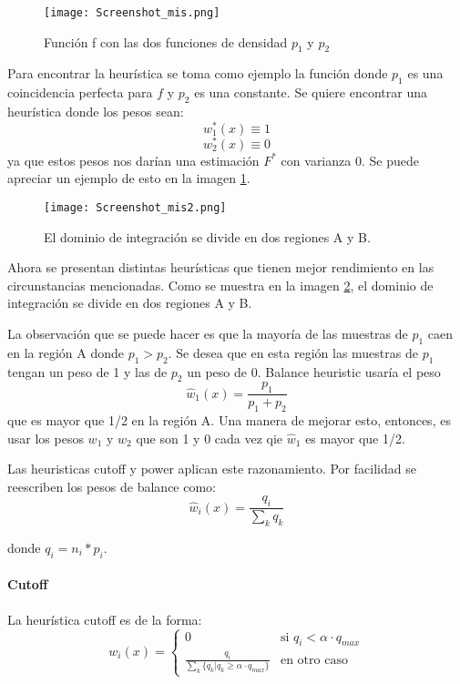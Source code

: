 \documentclass{article}
\begin{document}
\begin{figure}[H]
\centering
\texttt{[image: Screenshot\_mis.png]}
\caption{Función f con las dos funciones de densidad $p_{1}$ y $p_{2}$}
\label{fig:misother}
\end{figure}

Para encontrar la heurística se toma como ejemplo la función donde $p_{1}$ es una coincidencia perfecta para $f$ y $p_{2}$ es una constante.
Se quiere encontrar una heurística donde los pesos sean:
$$w^{*}_{1}(x) \equiv 1$$
$$w^{*}_{2}(x) \equiv 0$$
ya que estos pesos nos darían una estimación $F^{*}$ con varianza 0.
Se puede apreciar un ejemplo de esto en la imagen \ref{fig:misother}.

\begin{figure}[H]
\centering
\texttt{[image: Screenshot\_mis2.png]}
\caption{El dominio de integración se divide en dos regiones A y B.}
\label{fig:misother2}
\end{figure}

Ahora se presentan distintas heurísticas que tienen mejor rendimiento en las circunstancias mencionadas.
Como se muestra en la imagen \ref{fig:misother2}, el dominio de integración se divide en dos regiones A y B.

La observación que se puede hacer es que la mayoría de las muestras de $p_{1}$ caen en la región A donde $p_{1} > p_{2}$.
Se desea que en esta región las muestras de $p_{1}$ tengan un peso de 1 y las de $p_{2}$ un peso de 0.
Balance heuristic usaría el peso
$$ \hat{w}_{1}(x) = \frac{p_1}{p_1 + p_2} $$
que es mayor que 1/2 en la región A. Una manera de mejorar esto, entonces, es usar los pesos $w_{1}$ y $w_{2}$ que son 1 y 0 cada vez qie $\hat{w}_{1}$ es mayor que 1/2.

Las heuristicas cutoff y power aplican este razonamiento.
Por facilidad se reescriben los pesos de balance como:
$$ \hat{w}_{i}(x) = \frac{q_{i}}{\sum_{k} q_{k}} $$

donde $q_{i} = n_{i} * p_{i}$.

\paragraph{Cutoff} La heurística cutoff es de la forma:
$$ w_{i}(x) = \begin{cases} 0 & \text{si } q_{i} < \alpha \cdot q_{max} \\ \frac{q_{i}}{\sum_{k} \{ q_{k} | q_{k} \geq \alpha \cdot q_{max} \}} & \text{en otro caso} \end{cases}$$
\end{document}
